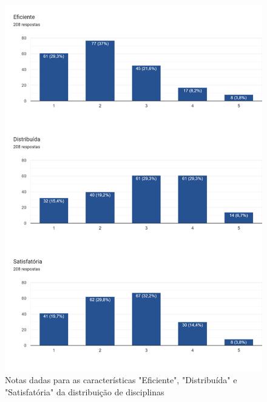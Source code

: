 \begin{figure}[htbp]
  \centering
  \caption{\label{fig:6.0-Opiniao-4_6}Notas dadas para as características "Eficiente", "Distribuída" e "Satisfatória" da distribuição de disciplinas}
  \includegraphics[scale=0.4]{files/img/Forms/6.0-Opiniao-4_6.png}
\end{figure}



